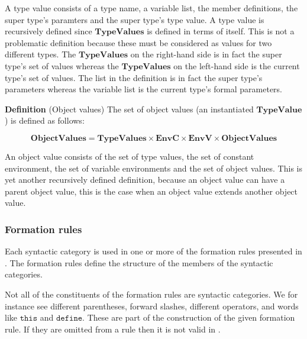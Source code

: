 A type value consists of a type name, a variable list, the member definitions,
the super type's paramters and the super type's type value. A type value is recursively defined since
$\mathbf{TypeValues}$ is defined in terms of itself. This is not a problematic
definition because these must be considered as values for two different types.
The $\mathbf{TypeValues}$ on the right-hand side is in fact the super type's set
of values whereas the $\mathbf{TypeValues}$ on the left-hand side is the current
type's set of values.  The list in the definition is in fact the super type's
parameters whereas the variable list is the current type's formal parameters.

\textbf{Definition} (Object values) \hspace{0.5cm} The set of object values (an instantiated $\mathbf{TypeValue}$) is
defined as follows:

\[
  \mathbf{ObjectValues} = \mathbf{TypeValues} \times \mathbf{EnvC} \times
  \mathbf{EnvV} \times \mathbf{ObjectValues}
\]

An object value consists of the set of type values, the set of constant
environment, the set of variable environments and the set of object values. This
is yet another recursively defined definition, because an object value can have a parent 
object value, this is the case when an object value extends another object value. 


\subsubsection{Formation rules}
Each syntactic category is used in one or more of the formation rules
presented in . The formation rules define the structure
of the members of the syntactic categories. 

Not all of the constituents of the formation rules are syntactic categories. We
for instance see different parentheses, forward slashes, different operators, and
words like $\texttt{this}$ and $\texttt{define}$. These are part of the
construction of the given formation rule. If they are omitted from a rule then
it is not valid in \productname{}.

